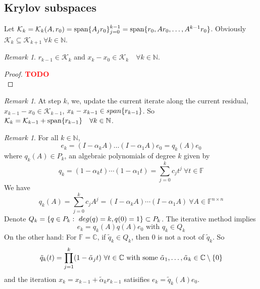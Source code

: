 \documentclass[12pt]{article}
\theoremstyle{definition}
\theoremstyle{remark}
\newtheorem{remark}[theorem]{Remark}
\numberwithin{equation}{section}
\newcommand{\F}{\mathbb{F}}
\newcommand{\C}{\mathbb{C}}
\newcommand{\N}{\mathbb{N}}
\newcommand{\TODO}[1][]{\textcolor{red}{\textbf{TODO\ifblank{#1}{}{:\ }#1}}\\}
\DeclarePairedDelimiter{\set}{\{}{\}}
\begin{document}
\subsection{Krylov subspaces}
Let $\mathcal{K}_k = \mathcal{K}_k(A, r_0) = \textnormal{span}\set{A_j r_0}_{j=0}^{k-1} = \textnormal{span} \set{r_0, A r_0, \ldots, A^{k-1} r_0}$. Obviously $\mathcal{K}_k \subseteq \mathcal{K}_{k+1}\  \forall k \in \N$.
\begin{remark}
  $r_{k-1} \in \mathcal{K}_k$ and $x_k - x_0 \in \mathcal{K}_k \quad \forall k \in \N$.
\end{remark}
\begin{proof}
  \TODO
\end{proof}
\begin{remark}
  At step $k$, we, update the current iterate along the current residual, $x_{k-1} - x_0 \in \mathcal{K}_{k-1}$, $x_k - x_{k-1} \in \mathnormal{span}\set{r_{k-1}}$. So $\mathcal{K}_k = \mathcal{K}_{k-1} + \textnormal{span}\set{r_{k-1}} \quad \forall k \in \N$.
\end{remark}
\begin{remark}
  For all $k \in \N$,
  \begin{equation*}
    e_k = (I - \alpha_k A) \ldots (I - \alpha_1 A) e_0 = q_k(A)e_0
  \end{equation*}
  where $q_k(A) \in P_k$, an algebraic polynomials of degree $k$ given by
  \begin{equation*}
    q_k = (1 - \alpha_k t) \cdots (1 - \alpha_1 t) = \sum_{j=0}^k c_j t^j \ \forall t \in \F
  \end{equation*}
  We have
  \begin{equation*}
    q_k(A) = \sum_{j=0}^k c_j A^j = (I - \alpha_k A) \cdots (I - \alpha_1 A) \ \forall A \in \F^{n \times n}
  \end{equation*}
  Denote $Q_k = \set{q \in P_k:\ deg(q) = k, q(0) = 1} \subset P_k$. The iterative method implies
  \begin{equation*}
    e_k = q_k(A)q(A)e_0 \text{ with } q_k \in Q_k
  \end{equation*}
  On the other hand: For $\F = \C$, if $\tilde{q}_k \in Q_k$, then 0 is not a root of $\tilde{q}_k$. So
  \begin{equation*}
    \tilde{q}_k(t) = \prod_{j=1}^k (1 - \tilde{\alpha}_j t)\ \forall t \in \C \text{ with some } \tilde{\alpha}_1, \ldots, \tilde{\alpha}_k \in \C \setminus \set{0}
  \end{equation*}
  and the iteration $x_k = x_{k-1} + \tilde{\alpha}_k r_{k-1}$ satisifies $e_k = \tilde{q}_k(A)e_0$.
\end{remark}
\end{document}
